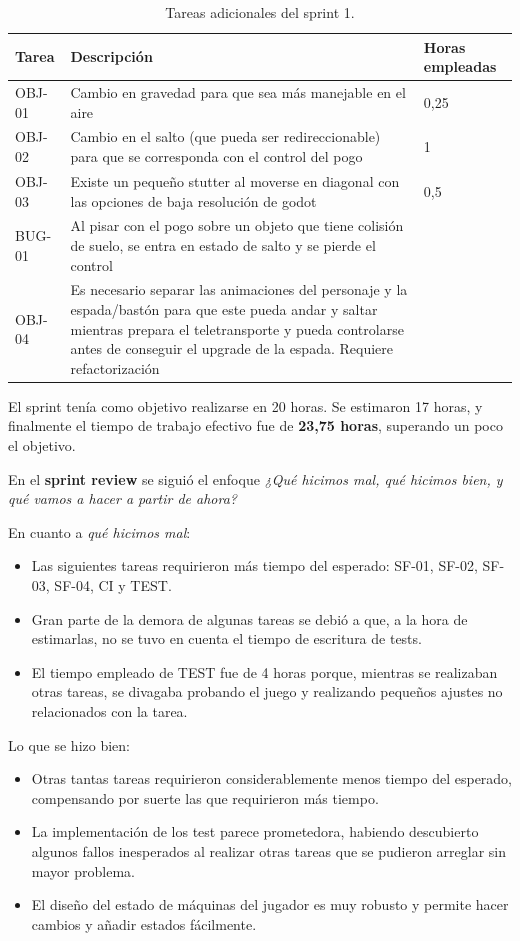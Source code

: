 \begin{table}[!ht]
    \centering
    \begin{tabular}{|l|p{8cm}|l|}
    \hline
        Tarea & Descripción & Horas empleadas \\ \hline
        OBJ-01 & Cambio en gravedad para que sea más manejable en el aire & 0,25 \\ \hline
        OBJ-02 & Cambio en el salto (que pueda ser redireccionable) para que se corresponda con el control del pogo & 1 \\ \hline
        OBJ-03 & Existe un pequeño stutter al moverse en diagonal con las opciones de baja resolución de godot & 0,5 \\ \hline
        BUG-01 & Al pisar con el pogo sobre un objeto que tiene colisión de suelo, se entra en estado de salto y se pierde el control & ~ \\ \hline
        OBJ-04 & Es necesario separar las animaciones del personaje y la espada/bastón para que este pueda andar y saltar mientras prepara el teletransporte y pueda controlarse antes de conseguir el upgrade de la espada. Requiere refactorización & ~ \\ \hline
    \end{tabular}
    \caption{Tareas adicionales del sprint 1.}
    \label{tab:aditionalsprint1task}
\end{table}

El sprint tenía como objetivo realizarse en 20 horas. Se estimaron 17 horas, y finalmente el tiempo de trabajo efectivo fue de \textbf{23,75 horas}, superando un poco el objetivo.

En el \textbf{sprint review} se siguió el enfoque \textit{¿Qué hicimos mal, qué hicimos bien, y qué vamos a hacer a partir de ahora?}

En cuanto a \textit{qué hicimos mal}:
\begin{itemize}
    \item Las siguientes tareas requirieron más tiempo del esperado: SF-01, SF-02, SF-03, SF-04, CI y TEST.
    \item Gran parte de la demora de algunas tareas se debió a que, a la hora de estimarlas, no se tuvo en cuenta el tiempo de escritura de tests.
    \item El tiempo empleado de TEST fue de 4 horas porque, mientras se realizaban otras tareas, se divagaba probando el juego y realizando pequeños ajustes no relacionados con la tarea.
\end{itemize}

Lo que se hizo bien:
\begin{itemize}
    \item Otras tantas tareas requirieron considerablemente menos tiempo del esperado, compensando por suerte las que requirieron más tiempo.
    \item La implementación de los test parece prometedora, habiendo descubierto algunos fallos inesperados al realizar otras tareas que se pudieron arreglar sin mayor problema.
    \item El diseño del estado de máquinas del jugador es muy robusto y permite hacer cambios y añadir estados fácilmente.
\end{itemize}

